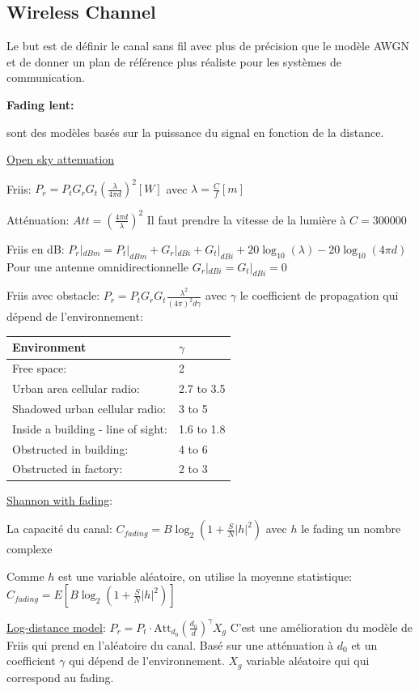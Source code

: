 \subsection*{Wireless Channel}
Le but est de définir le canal sans fil avec plus de précision que le modèle AWGN et de donner un
plan de référence plus réaliste pour les systèmes de communication.

\textbf{Fading lent:}

sont des modèles basés sur la puissance du signal en fonction
de la distance.

\underline{Open sky attenuation}

Friis: $P_r=P_t G_r G_t\left(\frac{\lambda}{4\pi d}\right)^2[W]$ avec $\lambda=\frac{C}{f}[m]$

Atténuation: $Att=\left(\frac{4\pi d}{\lambda}\right)^2$ Il faut prendre la vitesse de la lumière à $C=300 000$

Friis en dB: $P_r|_{dBm}=P_t|_{dBm}+G_r|_{dBi}+G_t|_{dBi}+20\log_{10}(\lambda)-20\log_{10}(4\pi d)$
Pour une antenne omnidirectionnelle $G_r|_{dBi}=G_t|_{dBi}=0$

Friis avec obstacle: $P_r=P_t G_r G_t\frac{\lambda^2}{(4\pi)^2 d\gamma}$
avec $\gamma$ le coefficient de propagation qui dépend de l'environnement:

\begin{tabular}{l|l}
    Environment                        & $\gamma$   \\ \hline
    Free space:                        & 2          \\
    Urban area cellular radio:         & 2.7 to 3.5 \\
    Shadowed urban cellular radio:     & 3 to 5     \\
    Inside a building - line of sight: & 1.6 to 1.8 \\
    Obstructed in building:            & 4 to 6     \\
    Obstructed in factory:             & 2 to 3
\end{tabular}

\underline{Shannon with fading}:

La capacité du canal: $C_{fading}=B\log_2(1+\frac{S}{N}|h|^2)$ avec $h$ le fading un nombre complexe

Comme $h$ est une variable aléatoire, on utilise la moyenne statistique:
$C_{fading}=E[B\log_2(1+\frac{S}{N}|h|^2)]$

\underline{Log-distance model}: $P_r=P_t\cdot\text{Att}_{d_0}(\frac{d_0}{d})^\gamma X_g$
C'est une amélioration du modèle de Friis qui prend en l'aléatoire du canal. Basé sur une atténuation
à $d_0$ et un coefficient $\gamma$ qui dépend de l'environnement. $X_g$ variable aléatoire qui
qui correspond au fading.

